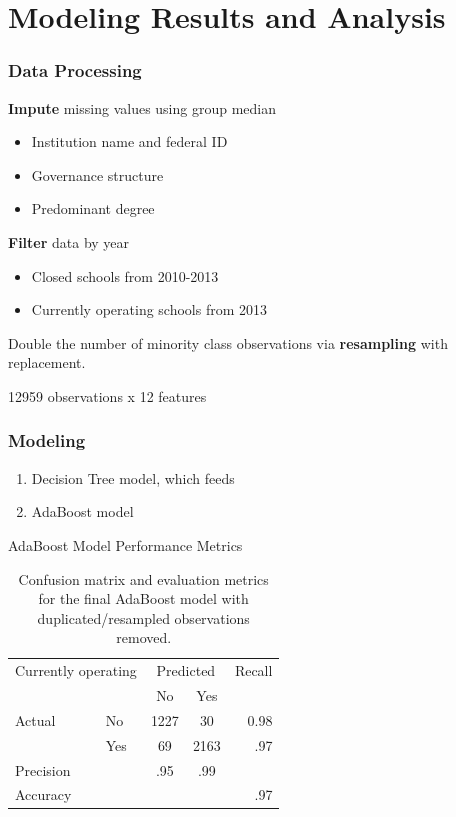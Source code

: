 \documentclass{beamer}
\begin{document}
\section{Modeling Results and Analysis } %
\begin{frame}
\frametitle{Data Processing}

\textbf{Impute} missing values using group median
\begin{itemize}
\item Institution name and federal ID
\item Governance structure  
\item Predominant degree 
\end{itemize}
\textbf{Filter} data by year
\begin{itemize}
\item Closed schools from 2010-2013
\item Currently operating schools from 2013
\end{itemize}

Double the number of minority class observations via \textbf{resampling} with replacement.

\vspace{1em}
12959 observations x 12 features

\end{frame}
\begin{frame}
\frametitle{Modeling}
\begin{enumerate}
\item Decision Tree model, which feeds 
\item AdaBoost model
\end{enumerate}

\begin{block} {AdaBoost Model Performance Metrics}
\begin{table}[h]
\begin{center}
\begin{tabular}{l l | c c r }
\multicolumn{2}{l}{Currently operating} & \multicolumn{2}{c}{Predicted} & Recall \\
& & No & Yes &  \\ 
\cline{2-5}
Actual & No & 1227 &  30 & 0.98 \\
& Yes & 69 & 2163 & .97 \\  \hline
Precision&  & .95 & .99 \\ 
Accuracy & & &  & .97 \\
	\end{tabular}
	\label{tab:ABConfusionNoDup}
	\caption{Confusion matrix and evaluation metrics for the final AdaBoost model with duplicated/resampled observations removed.}
\end{center}
\end{table}
\end{block}
\end{frame}
\end{document}
